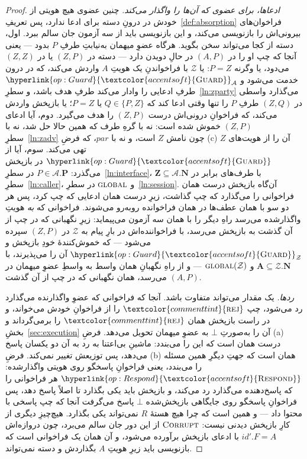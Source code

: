 \documentclass[10pt,oneside,openany]{book}
\newcommand{\Ps}{\mathbf{P}}
\newcommand{\admits}{\mathbf{N}}
\newcommand{\Apid}{\mathbf{A}}
\newcommand{\Zpid}{\mathbf{Z}}
\newcommand{\pars}{\mathit{par}}
\newcommand{\Zenv}{\mathcal{Z}}
\newcommand{\Adv}{\mathcal{A}}
\newcommand{\op}[1]{\textnormal{\textsc{#1}}}
\newcommand{\opl}[1]{\hyperlink{op:#1}{\textcolor{accentsoft}{\op{#1}}}}
\newcommand{\id}{id}
\newcommand{\atom}[1]{\textcolor{commenttint}{\op{#1}}}
\newcommand{\rej}{\atom{rej}}
\newcommand{\none}{\bot}
\theoremstyle{accentdef}
\theoremstyle{accentplain}
\begin{document}
\begin{proof}
\emph{ادعاها، برای عضوی که آن‌ها را واگذار می‌کند.} چنین عضوی هیچ هویتی از
خودش در درونِ دسته برای ادعا ندارد، پس تعریفِ~\ref{def:absorption}
فراخوان‌های بیرونی‌اش را بازنویسی می‌کند، و این بازنویسی باید از سه آزمون
جان سالم ببرد. اول، دسته از کجا می‌تواند سخن بگوید. هرگاه عضوِ میهمان
به‌نیابتِ طرفِ $P$ بدود --- یعنی آنجا که چپ او را در $(A,P)$ در حالِ
دویدن دارد --- دسته در $(Z,P)$ یا در $(Z,Z)$ می‌دود، یا وگرنه $P = Z$:
یا $\Zenv$ با فراخواندنِ یک هویتِ $A$ واردش می‌کند، که در درون خدمت
می‌شود و $\opl{Guard}_{\Adv}$ طرفِ ادعایی را وادار می‌کند طرفِ هدف باشد، و
سطرِ~\ref{ln:zparty} می‌گذارد واسطی در $(Z,Q)$ طرفِ $P$ را تنها وقتی
ادعا کند که $Q \in \{P,Z\}$ یا $P = Z$؛ یا بازپخش واردش می‌کند، که
فراخوانِ درونی‌اش درست $(Z,P)$ را هدف می‌گیرد. دوم، آیا ادعای $(Z,P)$
خموش شده است: نه با گرهِ طرف که همین حالا حل شد، نه با
سطرِ~\ref{ln:zadv} چون نامش $Z$ است، و نه با $\pars$، که فرضِ (c) آن را
از هویت‌های $Z$ تهی می‌کند. سوم، آیا از $\opl{Guard}$ در بازپخش می‌گذرد:
$P \in \Adv.\Ps$ در سطرِ~\ref{ln:interface}، $\Zpid \subseteq
\Adv.\admits$ با طرف‌های برابر در سطرِ~\ref{ln:caller}، و $\op{global}$ در
سطرِ~\ref{ln:session}. آن‌گاه بازپخش درست همان فراخوانی را می‌گذارد که چپ
گذاشت، زیرِ درست همان ادعایی که چپ کرد، پس هر دو سو با همان عطف‌ها در همان
فراخوانده روبه‌رو می‌شوند. فراخوانی که \emph{به} هویتِ واگذارشده می‌رسد
راهِ دیگر را با همان سه آزمون می‌پیماید: زیرِ نگهبانی که در چپ از آن گذشت
به بازپخش می‌رسد، با فراخواننده‌اش در بارِ پیام به $\Zenv$ در $(Z,P)$
سپرده می‌شود --- که خموش‌کنندهٔ خودِ بازپخش و $\opl{Guard}_{\Zenv}$ آن را
می‌پذیرند، با $\Apid \subseteq \Zenv.\admits$ و $\op{global}(\Zenv)$ ---
و از راهِ نگهبانِ همان واسط به واسطِ عضوِ میهمان در $(A,P)$ می‌رسد، همان
نگهبانی که در چپ از آن گذشت.

\emph{ردها.} یک مقدار می‌تواند متفاوت باشد. آنجا که فراخوانی که عضوِ
واگذارنده می‌گذارد رد می‌شود، چپ $\rej$ را از فراخوانِ خودش می‌خواند، و در
راست بازپخش همان $\rej$ را برمی‌گرداند و بخشِ~\ref{sec:execution} آن را
به‌صورتِ $\none$ به عضوِ میهمان تحویل می‌دهد. فرضِ (a) درست همان است که این
را می‌بندد: ماشینِ بی‌اعتنا به رد به آن دو یکسان پاسخ می‌دهد، پس توزیعش
تغییر نمی‌کند. فرضِ (b) همان است که جهتِ دیگرِ همین مسئله را می‌بندد،
یعنی فراخوانِ پاسخگو روی هویتی واگذارشده: $\opl{Respond}$ هر فراخوانی را
که پاسخ‌دهنده می‌گذارد رد می‌کند، و بازپخش باید یکی بگذارد تا اصلاً پاسخ
دهد، پس فراخوانِ پاسخگو روی جایگاهی بازپخش‌شده $\none$ پاسخ می‌گرفت آنجا
که چپ پاسخی با محتوا داد --- و همین است که چرا هیچ هستهٔ $R$ نمی‌تواند
یکی بگذارد. هیچ‌چیزِ دیگری از کارِ بازپخش دیدنی نیست: $\op{Corrupt}$ از
این دور جان سالم می‌برد، چون دروازه‌اش $\id'.F = A$ با ادعای بازپخش
برآورده می‌شود، و آن همان یک فراخوانی است که بازنویسی باید زیرِ هویتِ $A$
بگذاردش و دسته نمی‌تواند.


\end{proof}
\end{document}
